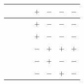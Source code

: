 \begin{table}[!ht]\tiny 
{}
\begin{center}\vspace{190pt} %
	\resizebox{8.7cm}{!} {
	  \begin{tabular}{|l|l|l|l|l|}
		\hline
 		{~}{~}{~}{~}{~}  & $+$ & $-$ & $-$ & $-$ \\ \hline
 		{~}{~}  & $+$ & $-$ & $-$ & $-$ \\ \hline
 		{~}{~}  & $+$ & $-$ & $-$ & $-$ \\ \hline
 		{~}{~}  & $-$ & $+$ & $+$ & $+$ \\ \hline
 		{~}{~}  & $-$ & $+$ & $-$ & $-$ \\ \hline
 		{~}{~}  & $-$ & $-$ & $+$ & $-$ \\ \hline
	  \end{tabular}
	}
\end{center}\vspace{-190pt} %
\end{table}%

